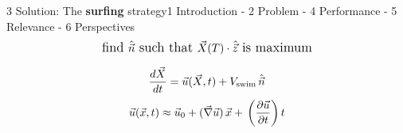 \begin{frame}{3 Solution: The \textbf{surfing} strategy}{1 Introduction - 2 Problem - 4 Performance - 5 Relevance - 6 Perspectives}
	\vspace{-20pt}
	\centering
	\begin{equation*}
		\large
		\text{find} ~ \hat{\vec{n}} ~ \text{such that} ~ \vec{X}(T) \cdot \hat{\vec{z}} ~ \text{is maximum}
	\end{equation*}

	\vspace{-5pt}
	\begin{figure}
	\end{figure}
	\pause
	\vspace{0pt}
	\begin{equation*}
		\label{eq:motion}
		\frac{d \vec{X}}{dt} = \vec{u} (\vec{X}, t) + V_{\mathrm{swim}} \, \hat{\vec{n}}
	\end{equation*}
	\pause
	\begin{equation*}
		\label{eq:linear}
		\vec{u} (\vec{x}, t) \approx \vec{u}_0 + (\vec{\nabla} \vec{u}) \, \vec{x} + \, \left(\frac{\partial \vec{u}}{\partial t} \right) t
	\end{equation*}	
\end{frame}

